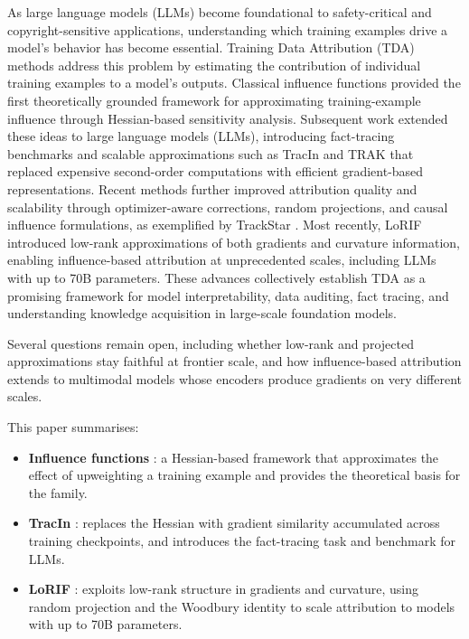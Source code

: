 \documentclass{article}
\begin{document}
As large language models (LLMs) become foundational to safety-critical and copyright-sensitive applications, understanding which training examples drive a model's behavior has become essential. Training Data Attribution (TDA) methods address this problem by estimating the contribution of individual training examples to a model's outputs. Classical influence functions \parencite{influence-functions-2017} provided the first theoretically grounded framework for approximating training-example influence through Hessian-based sensitivity analysis. Subsequent work extended these ideas to large language models (LLMs), introducing fact-tracing benchmarks and scalable approximations such as TracIn \parencite{tracein} and TRAK \parencite{trak} that replaced expensive second-order computations with efficient gradient-based representations. Recent methods further improved attribution quality and scalability through optimizer-aware corrections, random projections, and causal influence formulations, as exemplified by TrackStar \parencite{trackstar}. Most recently, LoRIF \parencite{loRIF} introduced low-rank approximations of both gradients and curvature information, enabling influence-based attribution at unprecedented scales, including LLMs with up to 70B parameters. These advances collectively establish TDA as a promising framework for model interpretability, data auditing, fact tracing, and understanding knowledge acquisition in large-scale foundation models.

Several questions remain open, including whether low-rank and projected approximations stay faithful at frontier scale, and how influence-based attribution extends to multimodal models whose encoders produce gradients on very different scales.

This paper summarises:
\begin{itemize}
    \item \textbf{Influence functions} \parencite{influence-functions-2017}: a Hessian-based framework that approximates the effect of upweighting a training example and provides the theoretical basis for the family.
    \item \textbf{TracIn} \parencite{tracein}: replaces the Hessian with gradient similarity accumulated across training checkpoints, and introduces the fact-tracing task and benchmark for LLMs.
    \item \textbf{LoRIF} \parencite{loRIF}: exploits low-rank structure in gradients and curvature, using random projection and the Woodbury identity to scale attribution to models with up to 70B parameters.
\end{itemize}
\end{document}
